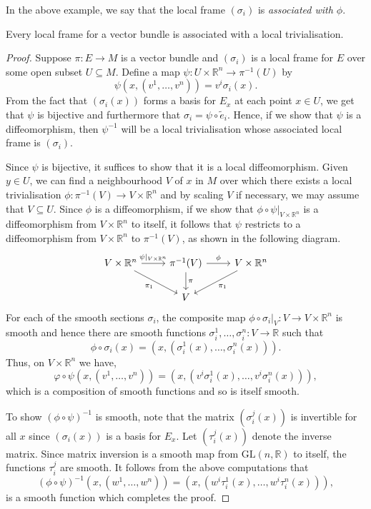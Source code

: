 In the above example, we say that the local frame $(\sigma_i)$ is \textit{associated with $\phi$}.
\begin{proposition}
Every local frame for a vector bundle is associated with a local trivialisation.
\label{vb-lf-lt}
\end{proposition}
\begin{proof}
Suppose $\pi:E\to M$ is a vector bundle and $(\sigma_i)$ is a local frame for $E$ over some open subset $U\subseteq M$. Define a map $\psi:U\times\mathbb{R}^n\to\pi^{-1}(U)$ by
\[
\psi(x,(v^1,\ldots,v^n))=v^i\sigma_i(x).
\]
From the fact that $(\sigma_i(x))$ forms a basis for $E_x$ at each point $x\in U$, we get that $\psi$ is bijective and furthermore that $\sigma_i=\psi\circ\tilde{e}_i$. Hence, if we show that $\psi$ is a diffeomorphism, then $\psi^{-1}$ will be a local trivialisation whose associated local frame is $(\sigma_i)$.

Since $\psi$ is bijective, it suffices to show that it is a local diffeomorphism. Given $y\in U$, we can find a neighbourhood $V$ of $x$ in $M$ over which there exists a local trivialisation $\phi:\pi^{-1}(V)\to V\times\mathbb{R}^n$ and by scaling $V$ if necessary, we may assume that $V\subseteq U$. Since $\phi$ is a diffeomorphism, if we show that $\phi\circ\psi\rvert_{V\times\mathbb{R}^n}$ is a diffeomorphism from $V\times\mathbb{R}^n$ to itself, it follows that $\psi$ restricts to a diffeomorphism from $V\times\mathbb{R}^n$ to $\pi^{-1}(V)$, as shown in the following diagram.
\[
\begin{tikzcd}
V\times\mathbb{R}^n\arrow{dr}[swap]{\pi_1} \arrow{r}{\psi\rvert_{V\times\mathbb{R}^n}} & \pi^{-1}(V) \arrow{r}{\phi} \arrow{d}{\pi} & V\times\mathbb{R}^n \arrow{dl}{\pi_1}\\
& V
\end{tikzcd}
\]
For each of the smooth sections $\sigma_i$, the composite map $\phi\circ\sigma_i\rvert_V:V\to V\times\mathbb{R}^n$ is smooth and hence there are smooth functions $\sigma^1_i,\ldots,\sigma^n_i:V\to\mathbb{R}$ such that
\[
\phi\circ\sigma_i(x)=\left(x,\left(\sigma^1_i(x),\ldots,\sigma^n_i(x) \right) \right).
\]
Thus, on $V\times\mathbb{R}^n$ we have,
\[
\varphi\circ\psi\left(x,(v^1,\ldots,v^n) \right)=\left(x,\left(v^i\sigma^1_i(x),\ldots,v^i\sigma^n_i(x) \right) \right),
\]
which is a composition of smooth functions and so is itself smooth.

To show $(\phi\circ\psi)^{-1}$ is smooth, note that the matrix $(\sigma^j_i(x))$ is invertible for all $x$ since $(\sigma_i(x))$ is a basis for $E_x$. Let $(\tau^j_i(x))$ denote the inverse matrix. Since matrix inversion is a smooth map from $\mathrm{GL}(n,\mathbb{R})$ to itself, the functions $\tau^j_i$ are smooth. It follows from the above computations that
\[
(\phi\circ\psi)^{-1}\left(x,(w^1,\ldots,w^n)\right)=\left(x,\left(w^i\tau^1_i(x),\ldots,w^i\tau^n_i(x) \right) \right),
\]
is a smooth function which completes the proof.
\end{proof}
